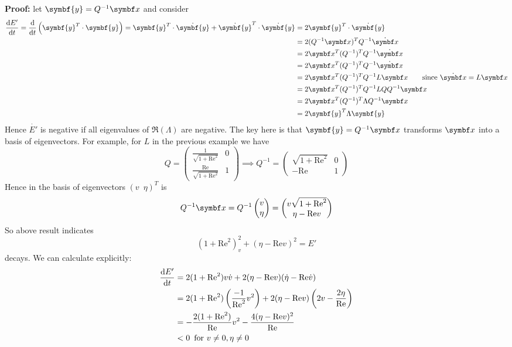 \documentclass{jknotes}
\newcommand{\ReN}{\text{Re}}
\renewcommand{\y}{\symbf{y}}
\begin{document}
\textbf{Proof:} let $\y = Q^{-1} \x$ and consider 
\begin{align}
	\frac{\diffd E'}{\diffd t} = \frac{\diffd}{\diffd t} \left( \y^T \cdot
	\y\right) = \y^T \cdot \dot{\y} + \dot{\y}^T \cdot \dot{\y} &= 2 \y^T
	\cdot \dot{\y} \\
			  &= 2 (Q^{-1}\x)^TQ^{-1}\dot{\x} \\
			  &= 2\x^T (Q^{-1})^T Q^{-1}\dot{\x} \\
			  &= 2 \x^T (Q^{-1})^T Q^{-1} \dot{\x} \\
			  &= 2 \x^T (Q^{-1})^T Q^{-1} L \x \hspace{2em} \text{since} \,\,
			  \dot{\x} = L \x \\
			  &= 2 \x^T (Q^{-1})^T Q^{-1} L Q Q^{-1} \x \\
			  &= 2 \x^T (Q^{-1})^T \Lambda Q^{-1} \x \\
			  &= 2 \y^T \Lambda \y 
\end{align}
Hence $\dot{E'}$ is negative if all eigenvalues of $\Re(\Lambda)$ are
negative. The key here is that $\y = Q^{-1} \x$ transforms $\x$ into a basis
of eigenvectors.  For example, for $L$ in the previous example we have
\begin{equation}
	Q = \begin{pmatrix} \frac{1}{\sqrt{1+\ReN^2}} & 0 \\
	\frac{\ReN}{\sqrt{1+\ReN^2}} & 1 \end{pmatrix} \implies Q^{-1} =
		\begin{pmatrix} \sqrt{1+\ReN^2} & 0 \\ -\ReN & 1 \end{pmatrix}
\end{equation}
Hence in the basis of eigenvectors $(v \,\,\, \eta)^T$ is
\begin{equation}
	Q^{-1}\x = Q^{-1} \begin{pmatrix} v \\ \eta \end{pmatrix} =
	\begin{pmatrix} v \sqrt{1+\ReN^2} \\ \eta - \ReN v \end{pmatrix}
\end{equation}
So above result indicates 
\begin{equation}
	(1+\ReN^2)_v^2 + (\eta- \ReN v)^2 = E'
\end{equation}
decays. We can calculate explicitly:
\begin{align}
	\frac{\diffd E'}{\diffd t} 
	&= 2(1+\ReN^2)v\dot{v} + 2(\eta-\ReN v)(\dot{\eta} - \ReN \dot{v}) \\
	&= 2 (1+\ReN^2)\left(\frac{-1}{\ReN^2} v^2\right) + 2(\eta - \ReN
	v)\left(2v - \frac{2\eta}{\ReN}\right) \\
	&= -\frac{2(1+\ReN^2)}{\ReN} v^2 - \frac{4(\eta - \ReN v)^2}{\ReN}\\
	&< 0 \,\,\, \text{for} \,\, v \ne 0, \eta \ne 0
\end{align}
\end{document}
